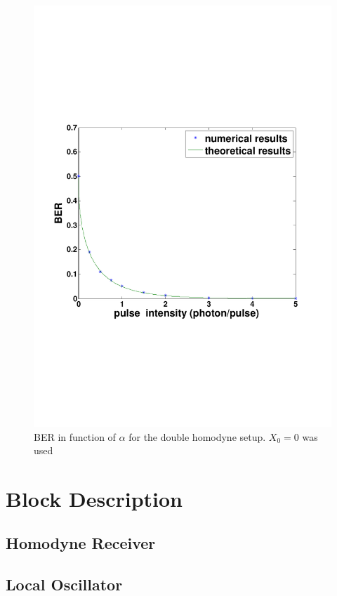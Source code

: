 \documentclass[a4paper]{article}
\begin{document}
\begin{figure}[h]
\centering
\includegraphics[width=\linewidth, trim= 0mm 60mm 0mm 70mm]{adaptedBER.pdf}
\caption{BER in function of $\alpha$ for the double homodyne setup. $X_0=0$ was used}
\label{fig:adaptedber}
\end{figure}

\section{Block Description}

\subsection{Homodyne Receiver}


\subsection{Local Oscillator}

\end{document}
